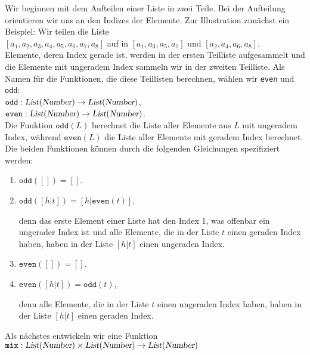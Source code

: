 Wir beginnen mit dem Aufteilen einer Liste in zwei Teile.  Bei der Aufteilung orientieren wir
uns an den Indizes der Elemente.  Zur Illustration zun\"{a}chst ein Beispiel: Wir teilen die Liste \\[0.2cm]
\hspace*{1.3cm} 
$[a_1, a_2, a_3, a_4, a_5, a_6, a_7, a_8]$ \quad auf in \quad
$[a_1, a_3, a_5, a_7]$ \quad und \quad $[a_2, a_4, a_6, a_8]$.
\\[0.2cm]
Elemente, deren Index gerade ist, werden in der ersten
Teilliste aufgesammelt und die Elemente mit ungeradem Index sammeln wir in der zweiten
Teilliste.  Als Namen f\"{u}r die  Funktionen, die diese Teillisten berechnen, w\"{a}hlen 
wir \texttt{even} und \texttt{odd}: \\[0.2cm]
\hspace*{1.3cm} 
$\texttt{odd}: \textsl{List}(\textsl{Number}) \rightarrow \textsl{List}(\textsl{Number})$,
\\[0.2cm]
\hspace*{1.3cm} 
$\texttt{even}: \textsl{List}(\textsl{Number}) \rightarrow \textsl{List}(\textsl{Number})$.
\\[0.2cm]
Die Funktion $\texttt{odd}(L)$ berechnet die Liste aller Elemente aus $L$ mit ungeradem Index, 
w\"{a}hrend $\mathtt{even}(L)$ die Liste aller Elemente mit geradem Index berechnet.
Die beiden Funktionen k\"{o}nnen durch die folgenden Gleichungen spezifiziert werden:
\begin{enumerate}
\item $\texttt{odd}([]) = []$.
\item $\texttt{odd}([h|t]) = [h|\texttt{even}(t)]$,

      denn das erste Element einer Liste hat den Index 1, was offenbar ein ungerader Index
      ist und alle Elemente, die in der Liste $t$ einen geraden Index haben, haben in der
      Liste $[h|t]$ einen ungeraden Index.
\item $\texttt{even}([]) = []$.
\item $\texttt{even}([h|t]) = \texttt{odd}(t)$,

      denn alle Elemente, die in der Liste $t$ einen ungeraden Index haben, haben in der Liste
      $[h|t]$ einen geraden Index.
\end{enumerate}
Als n\"{a}chstes entwickeln wir eine Funktion \\[0.2cm]
\hspace*{1.3cm} $\texttt{mix}: \textsl{List}(\textsl{Number}) \times \textsl{List}(\textsl{Number}) \rightarrow \textsl{List}(\textsl{Number})$
